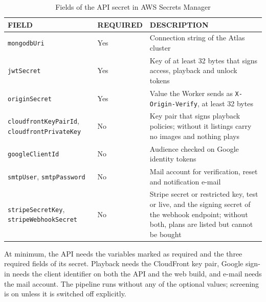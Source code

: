 \begin{table}[H]
\centering
\caption{Fields of the API secret in AWS Secrets Manager}
\label{tab:env-secret}
\footnotesize
\begin{tabularx}{\textwidth}{>{\raggedright\arraybackslash}p{} >{\raggedright\arraybackslash}p{} >{\raggedright\arraybackslash}X}
\toprule
\textbf{FIELD} & \textbf{REQUIRED} & \textbf{DESCRIPTION} \\
\midrule
\texttt{mongodbUri} & Yes & Connection string of the Atlas cluster \\
\texttt{jwtSecret} & Yes & Key of at least 32 bytes that signs access, playback and unlock tokens \\
\texttt{originSecret} & Yes & Value the Worker sends as \texttt{X-Origin-Verify}, at least 32 bytes \\
\texttt{cloudfrontKeyPairId}, \texttt{cloudfrontPrivateKey} & No & Key pair that signs playback policies; without it listings carry no images and nothing plays \\
\texttt{googleClientId} & No & Audience checked on Google identity tokens \\
\texttt{smtpUser}, \texttt{smtpPassword} & No & Mail account for verification, reset and notification e-mail \\
\texttt{stripeSecretKey}, \texttt{stripeWebhookSecret} & No & Stripe secret or restricted key, test or live, and the signing secret of the webhook endpoint; without both, plans are listed but cannot be bought \\
\bottomrule
\end{tabularx}
\end{table}

At minimum, the API needs the variables marked as required and the three required fields of its secret.
Playback needs the CloudFront key pair, Google sign-in needs the client identifier on both the API and
the web build, and e-mail needs the mail account. The pipeline runs without any of the optional values;
screening is on unless it is switched off explicitly.
